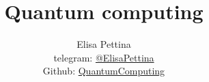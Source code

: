 

\title{\Huge\textbf{{Quantum computing}}}

\author{
  Elisa Pettina \\
  \small telegram: \href{https://t.me/elisapettina}{@ElisaPettina} \\[3pt]
\small Github: \href{https://github.com/Elisshaze/QuantumComputing}{QuantumComputing}
}


\maketitle
\tableofcontents




